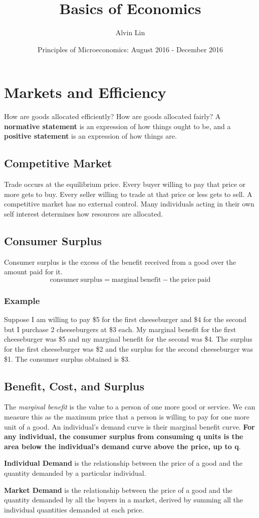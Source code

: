 \documentclass{article}
\title{Basics of Economics}
\author{Alvin Lin}
\date{Principles of Microeconomics: August 2016 - December 2016}
\begin{document}
\maketitle

\section{Markets and Efficiency}
How are goods allocated efficiently? How are goods allocated fairly? A
\textbf{normative statement} is an expression of how things ought to be, and a
\textbf{positive statement} is an expression of how things are.

\subsection{Competitive Market}
Trade occurs at the equilibrium price. Every buyer willing to pay that price
or more gets to buy. Every seller willing to trade at that price or less
gets to sell. A competitive market has no external control. Many individuals
acting in their own self interest determines how resources are allocated.

\subsection{Consumer Surplus}
Consumer surplus is the excess of the benefit received from a good over the
amount paid for it.
\[ \mathrm{consumer\ surplus} = \mathrm{marginal\ benefit}-
   \mathrm{the\ price\ paid} \]

\subsubsection{Example}
Suppose I am willing to pay \$5 for the first cheeseburger and \$4 for the
second but I purchase 2 cheeseburgers at \$3 each. My marginal benefit for the
first cheeseburger was \$5 and my marginal benefit for the second was \$4. The
surplus for the first cheeseburger was \$2 and the surplus for the second
cheeseburger was \$1. The consumer surplus obtained is \$3.

\subsection{Benefit, Cost, and Surplus}
The \textit{marginal benefit} is the value to a person of one more good or
service. We can measure this as the maximum price that a person is willing to
pay for one more unit of a good. An individual's demand curve is their marginal
benefit curve. \textbf{For any individual, the consumer surplus from consuming
q units is the area below the individual's demand curve above the price, up to
q}. \par
\textbf{Individual Demand} is the relationship between the price of a good and
the quantity demanded by a particular individual. \par
\textbf{Market Demand} is the relationship between the price of a good and the
quantity demanded by all the buyers in a market, derived by summing all the
individual quantities demanded at each price.
\end{document}
